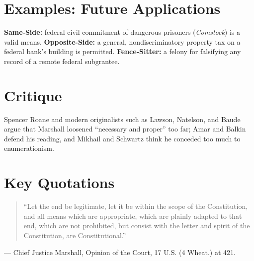 \documentclass[12pt]{article}
\begin{document}
\section{Examples: Future Applications}
\textbf{Same-Side:} federal civil commitment of dangerous prisoners (\textit{Comstock}) is a valid means. \textbf{Opposite-Side:} a general, nondiscriminatory property tax on a federal bank's building is permitted. \textbf{Fence-Sitter:} a felony for falsifying any record of a remote federal subgrantee.

\section{Critique}
Spencer Roane and modern originalists such as Lawson, Natelson, and Baude argue that Marshall loosened ``necessary and proper'' too far; Amar and Balkin defend his reading, and Mikhail and Schwartz think he conceded too much to enumerationism.

\section{Key Quotations}
\begin{quote}
``Let the end be legitimate, let it be within the scope of the Constitution, and all means which are appropriate, which are plainly adapted to that end, which are not prohibited, but consist with the letter and spirit of the Constitution, are Constitutional.''
\end{quote}
\noindent --- Chief Justice Marshall, Opinion of the Court, 17 U.S. (4 Wheat.) at 421.
\end{document}
